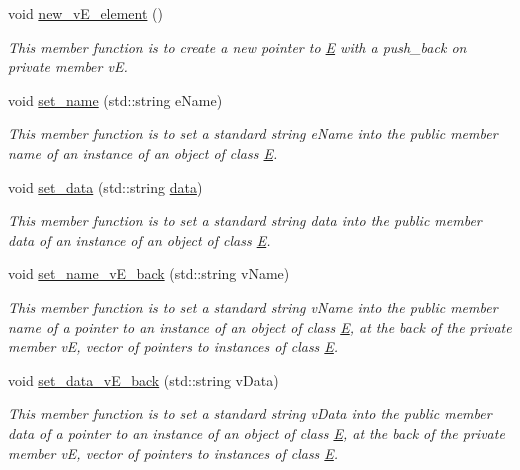 \begin{DoxyCompactItemize}
void \hyperlink{classE_a5fef91a84daddb1e9a1cfd2de704c229}{new\+\_\+v\+E\+\_\+element} ()
\begin{DoxyCompactList}\small\item\em This member function is to create a new pointer to \hyperlink{classE}{E} with a push\+\_\+back on private member vE. \end{DoxyCompactList}\item 
void \hyperlink{group__group__set_ga2536bf5e123b74905fac652168eacecc}{set\+\_\+name} (std\+::string e\+Name)
\begin{DoxyCompactList}\small\item\em This member function is to set a standard string e\+Name into the public member \textquotesingle{}name\textquotesingle{} of an instance of an object of class \hyperlink{classE}{E}. \end{DoxyCompactList}\item 
void \hyperlink{group__group__set_ga35efd42862ed6cfd72a3a8cf9011c707}{set\+\_\+data} (std\+::string \hyperlink{classE_ae199dfce04c109f23799a5708a14a74a}{data})
\begin{DoxyCompactList}\small\item\em This member function is to set a standard string data into the public member \textquotesingle{}data\textquotesingle{} of an instance of an object of class \hyperlink{classE}{E}. \end{DoxyCompactList}\item 
void \hyperlink{group__group__set_gaa28d3672c579987f459c43c33339131b}{set\+\_\+name\+\_\+v\+E\+\_\+back} (std\+::string v\+Name)
\begin{DoxyCompactList}\small\item\em This member function is to set a standard string v\+Name into the public member \textquotesingle{}name\textquotesingle{} of a pointer to an instance of an object of class \hyperlink{classE}{E}, at the back of the private member vE, vector of pointers to instances of class \hyperlink{classE}{E}. \end{DoxyCompactList}\item 
void \hyperlink{group__group__set_gafd194bd2e8b88814d8ad8c47065ee6ce}{set\+\_\+data\+\_\+v\+E\+\_\+back} (std\+::string v\+Data)
\begin{DoxyCompactList}\small\item\em This member function is to set a standard string v\+Data into the public member \textquotesingle{}data\textquotesingle{} of a pointer to an instance of an object of class \hyperlink{classE}{E}, at the back of the private member vE, vector of pointers to instances of class \hyperlink{classE}{E}. \end{DoxyCompactList}\item 

\end{DoxyCompactItemize}
